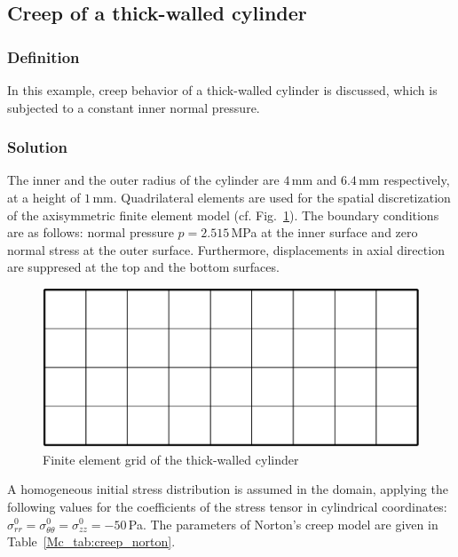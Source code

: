 \subsection{Creep of a thick-walled cylinder}
\label{subsec:Mc1}

\subsubsection{Definition}
\label{subsubsec:Mc1_def}

In this example, creep behavior of a thick-walled cylinder is discussed, which is subjected to a constant inner normal pressure.

\subsubsection{Solution}
\label{subsubsec:Mc1_sol}

The inner and the outer radius of the cylinder are $4\,$mm and $6.4\,$mm respectively, at a height of $1\,$mm. Quadrilateral elements are used for the spatial discretization of the axisymmetric finite element model (cf. Fig.~\ref{Mc_fig:meshcrp}). The boundary conditions are as follows: normal pressure $p=2.515\,$MPa at the inner surface and zero normal stress at the outer surface. Furthermore, displacements in axial direction are suppresed at the top and the bottom surfaces. 
%
\begin{figure}[!htb]
\centering
\includegraphics[scale=0.3]{PART_II/M/mesh_crp}
\caption{Finite element grid of the thick-walled cylinder}
\label{Mc_fig:meshcrp}
\end{figure}

A homogeneous initial stress distribution is assumed in the domain, applying the following values for the coefficients of the stress tensor in cylindrical coordinates: $\sigma_{rr}^0=\sigma_{\theta\theta}^0=\sigma_{zz}^0=-50\,$Pa. The parameters of Norton's creep model are given in Table~\ref{Mc_tab:creep_norton}.

